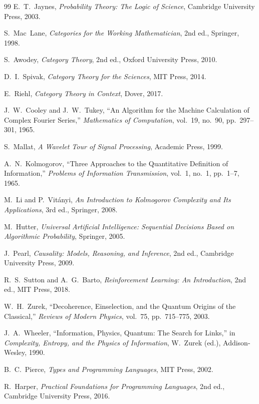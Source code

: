 \documentclass[12pt, a4paper]{article}
\theoremstyle{plain}
\theoremstyle{definition}
\theoremstyle{remark}
\begin{document}
\begin{thebibliography}{99}
E.~T.~Jaynes,
\emph{Probability Theory: The Logic of Science},
Cambridge University Press, 2003.

S.~Mac~Lane,
\emph{Categories for the Working Mathematician},
2nd ed., Springer, 1998.

S.~Awodey,
\emph{Category Theory},
2nd ed., Oxford University Press, 2010.

D.~I.~Spivak,
\emph{Category Theory for the Sciences},
MIT Press, 2014.

E.~Riehl,
\emph{Category Theory in Context},
Dover, 2017.

J.~W.~Cooley and J.~W.~Tukey,
``An Algorithm for the Machine Calculation of Complex Fourier Series,''
\emph{Mathematics of Computation}, vol.~19, no.~90, pp.~297--301, 1965.

S.~Mallat,
\emph{A Wavelet Tour of Signal Processing},
Academic Press, 1999.

A.~N.~Kolmogorov,
``Three Approaches to the Quantitative Definition of Information,''
\emph{Problems of Information Transmission}, vol.~1, no.~1, pp.~1--7, 1965.

M.~Li and P.~Vit\'{a}nyi,
\emph{An Introduction to Kolmogorov Complexity and Its Applications},
3rd ed., Springer, 2008.

M.~Hutter,
\emph{Universal Artificial Intelligence: Sequential Decisions Based on Algorithmic Probability},
Springer, 2005.

J.~Pearl,
\emph{Causality: Models, Reasoning, and Inference},
2nd ed., Cambridge University Press, 2009.

R.~S.~Sutton and A.~G.~Barto,
\emph{Reinforcement Learning: An Introduction},
2nd ed., MIT Press, 2018.

W.~H.~Zurek,
``Decoherence, Einselection, and the Quantum Origins of the Classical,''
\emph{Reviews of Modern Physics}, vol.~75, pp.~715--775, 2003.

J.~A.~Wheeler,
``Information, Physics, Quantum: The Search for Links,''
in \emph{Complexity, Entropy, and the Physics of Information},
W.~Zurek (ed.), Addison-Wesley, 1990.

B.~C.~Pierce,
\emph{Types and Programming Languages},
MIT Press, 2002.

R.~Harper,
\emph{Practical Foundations for Programming Languages},
2nd ed., Cambridge University Press, 2016.


\end{thebibliography}
\end{document}
